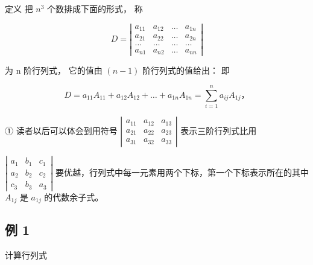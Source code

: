 定义 把 \(n^3\) 个数排成下面的形式， 称

\[
D = \left| \begin{array}{cccc} a _ {11} & a _ {12} & \dots & a _ {1 n} \\ a _ {21} & a _ {22} & \dots & a _ {2 n} \\ \dots & \dots & \dots & \dots \\ a _ {n 1} & a _ {n 2} & \dots & a _ {n n} \end{array} \right|
\]

为 n 阶行列式， 它的值由 \((n-1)\) 阶行列式的值给出： 即

\[
D = a _ {11} A _ {11} + a _ {12} A _ {12} + \dots + a _ {1 n} A _ {1 n} = \sum_ {i = 1} ^ {n} a _ {i j} A _ {1 j}\text{，}
\]

① 读者以后可以体会到用符号
\(\left|\begin{array}{ccc}a_{11}&a_{12}&a_{13}\\a_{21}&a_{22}&a_{23}\\a_{31}&a_{32}&a_{33}\end{array}\right|\)
表示三阶行列式比用

\(\left|\begin{array}{ccc}a_{1}&b_{1}&c_{1}\\a_{2}&b_{2}&c_{2}\\c_{3}&b_{3}&a_{3}\end{array}\right|\)
要优越，行列式中每一元素用两个下标，第一个下标表示所在的其中 \(A_{1j}\)
是 \(a_{1j}\) 的代数余子式。

\subsection{例 1}

计算行列式

